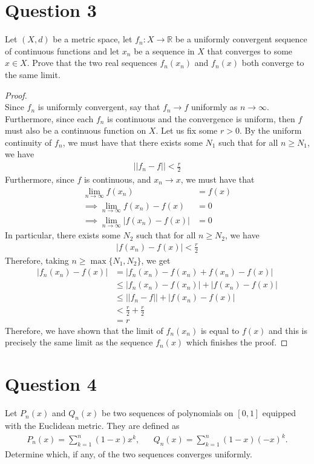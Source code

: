 \documentclass[10pt,a4paper]{article}
\theoremstyle{definition}
\theoremstyle{definition}
\numberwithin{equation}{section}
\begin{document}
\section*{Question 3}
Let $(X, d)$ be a metric space, let $f_n : X \to \mathbb{R}$ be a uniformly convergent sequence of continuous functions and let $x_n$ be a sequence in $X$ that converges to some $x \in X$. Prove that the two real sequences $f_n(x_n)$ and $f_n(x)$ both converge to the same limit. 

\begin{proof}$ $
\\Since $f_n$ is uniformly convergent, say that $f_n \to f$ uniformly as $n \to \infty$. Furthermore, since each $f_n$ is continuous and the convergence is uniform, then $f$ must also be a continuous function on $X$. Let us fix some $r > 0$. By the uniform continuity of $f_n$, we must have that there exists some $N_1$ such that for all $n \geq N_1$, we have
\begin{align*}
||f_n - f|| < \frac{r}{2}
\end{align*}
Furthermore, since $f$ is continuous, and $x_n \to x$, we must have that
\begin{align*}
\lim_{n \to \infty} f(x_n) &= f(x)\\
\implies \lim_{n \to \infty} f(x_n) - f(x) &= 0\\
\implies \lim_{n \to \infty} |f(x_n) - f(x)| &= 0
\end{align*}
In particular, there exists some $N_2$ such that for all $n \geq N_2$, we have
\begin{align*}
|f(x_n) - f(x)| < \frac{r}{2}
\end{align*}
Therefore, taking $n \geq \max\{N_1, N_2\}$, we get
\begin{align*}
|f_n(x_n) - f(x)| &= |f_n(x_n) - f(x_n) + f(x_n) - f(x)|\\
&\leq |f_n(x_n) - f(x_n)| + |f(x_n) - f(x)|\\
&\leq ||f_n - f|| + |f(x_n) - f(x)|\\
&< \frac{r}{2} + \frac{r}{2}\\
&= r
\end{align*}
Therefore, we have shown that the limit of $f_n(x_n)$ is equal to $f(x)$ and this is precisely the same limit as the sequence $f_n(x)$ which finishes the proof. 
\end{proof}

\section*{Question 4}
Let $P_n(x)$ and $Q_n(x)$ be two sequences of polynomials on $[0, 1]$ equipped with the Euclidean metric. They are defined as 
\begin{align*}
P_n(x) = \sum_{k = 1}^n (1 - x)x^k, && Q_n(x) = \sum_{k = 1}^n (1 - x)(-x)^k.
\end{align*}
Determine which, if any, of the two sequences converges uniformly. 
\end{document}

